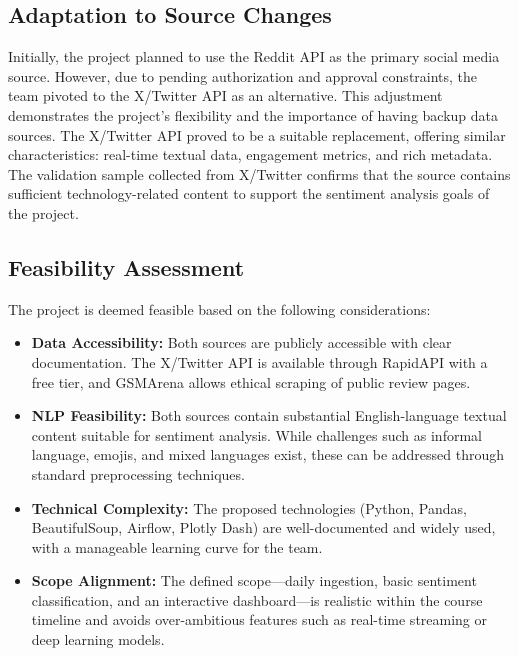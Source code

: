 \documentclass[12pt]{article}
\begin{document}
\subsection{Adaptation to Source Changes}
Initially, the project planned to use the Reddit API as the primary social media source. However, due to pending authorization and approval constraints, the team pivoted to the X/Twitter API as an alternative. This adjustment demonstrates the project's flexibility and the importance of having backup data sources. The X/Twitter API proved to be a suitable replacement, offering similar characteristics: real-time textual data, engagement metrics, and rich metadata. The validation sample collected from X/Twitter confirms that the source contains sufficient technology-related content to support the sentiment analysis goals of the project.

\subsection{Feasibility Assessment}
The project is deemed feasible based on the following considerations:
\begin{itemize}
    \item \textbf{Data Accessibility:} Both sources are publicly accessible with clear documentation. The X/Twitter API is available through RapidAPI with a free tier, and GSMArena allows ethical scraping of public review pages.
    \item \textbf{NLP Feasibility:} Both sources contain substantial English-language textual content suitable for sentiment analysis. While challenges such as informal language, emojis, and mixed languages exist, these can be addressed through standard preprocessing techniques.
    \item \textbf{Technical Complexity:} The proposed technologies (Python, Pandas, BeautifulSoup, Airflow, Plotly Dash) are well-documented and widely used, with a manageable learning curve for the team.
    \item \textbf{Scope Alignment:} The defined scope—daily ingestion, basic sentiment classification, and an interactive dashboard—is realistic within the course timeline and avoids over-ambitious features such as real-time streaming or deep learning models.
\end{itemize}
\end{document}
